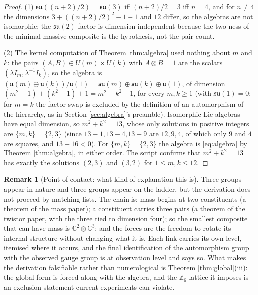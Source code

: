 \documentclass[11pt]{article}
\theoremstyle{definition}
\newtheorem{remark}[theorem]{Remark}
\newcommand{\C}{\mathbb{C}}
\newcommand{\su}{\mathfrak{su}}
\newcommand{\uu}{\mathfrak{u}}
\begin{document}
\begin{proof}
(1) $\su((n+2)/2) = \su(3)$ iff $(n+2)/2 = 3$ iff $n = 4$, and for $n \neq 4$ the dimensions $3 + ((n+2)/2)^{2} - 1 + 1$ and $12$ differ, so the algebras are not isomorphic; the $\su(2)$ factor is dimension-independent because the two-ness of the minimal massive composite is the hypothesis, not the pair count.

(2) The kernel computation of Theorem \ref{thm:algebra} used nothing about $m$ and $k$: the pairs $(A, B) \in U(m) \times U(k)$ with $A \otimes B = 1$ are the scalars $(\lambda I_{m}, \lambda^{-1}I_{k})$, so the algebra is $(\uu(m) \oplus \uu(k))/\uu(1) = \su(m) \oplus \su(k) \oplus \uu(1)$, of dimension $(m^{2} - 1) + (k^{2} - 1) + 1 = m^{2} + k^{2} - 1$, for every $m, k \ge 1$ (with $\su(1) = 0$; for $m = k$ the factor swap is excluded by the definition of an automorphism of the hierarchy, as in Section \ref{sec:algebra}'s preamble). Isomorphic Lie algebras have equal dimension, so $m^{2} + k^{2} = 13$, whose only solutions in positive integers are $\{m, k\} = \{2, 3\}$ (since $13 - 1, 13 - 4, 13 - 9$ are $12, 9, 4$, of which only $9$ and $4$ are squares, and $13 - 16 < 0$). For $\{m, k\} = \{2, 3\}$ the algebra is \eqref{eq:algebra} by Theorem \ref{thm:algebra}, in either order. The script confirms that $m^{2} + k^{2} = 13$ has exactly the solutions $(2, 3)$ and $(3, 2)$ for $1 \le m, k \le 12$.
\end{proof}

\begin{remark}[Point of contact: what kind of explanation this is]\label{rem:whatkind}
Three groups appear in nature and three groups appear on the ladder, but the derivation does not proceed by matching lists. The chain is: mass begins at two constituents (a theorem of the mass paper); a constituent carries three pairs (a theorem of the twistor paper, with the three tied to dimension four); so the smallest composite that can have mass is $\C^{2} \otimes \C^{3}$; and the forces are the freedom to rotate its internal structure without changing what it is. Each link carries its own level, itemised where it occurs, and the final identification of the automorphism group with the observed gauge group is at observation level and says so. What makes the derivation falsifiable rather than numerological is Theorem \ref{thm:global}(iii): the global form is forced along with the algebra, and the $\mathbb{Z}_{6}$ lattice it imposes is an exclusion statement current experiments can violate.
\end{remark}
\end{document}
